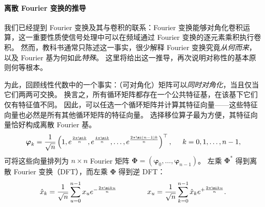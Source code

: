 


\paragraph{离散 Fourier 变换的推导}
我们已经提到 Fourier 变换及其与卷积的联系：Fourier 变换能够对角化卷积运算，这一重要性质使信号处理中可以在频域通过 Fourier 变换的逐元素乘积执行卷积。
%
然而，教科书通常只陈述这一事实，很少解释 Fourier 变换究竟{\em 从何而来}，以及 Fourier 基为何如此{\em 特殊}。
%
这里将给出这一推导，再次说明对称性的基本原则何等根本。


为此，回顾线性代数中的一个事实：（可对角化）矩阵可以{\em 同时对角化}，当且仅当它们两两可交换。
%
换言之，所有循环矩阵都存在一个公共特征基，在该基下它们仅有特征值不同。
%
因此，可以任选一个循环矩阵并计算其特征向量——这些特征向量也必然是所有其他循环矩阵的特征向量。
选择移位算子最为方便，其特征向量恰好构成离散 Fourier 基。
$$
\boldsymbol{\varphi}_k = \frac{1}{\sqrt{n}}\left (1, e^{ \frac{2\pi \mi k}{n}}, e^{ \frac{4\pi \mi k}{n} }, \hdots , e^{ \frac{2\pi \mi  (n-1)k}{n} }
\right)^\top, \hspace{5mm} k = 0, 1, \hdots, n-1,  
$$
%
可将这些向量排列为 $n\times n$ Fourier 矩阵 $\boldsymbol{\Phi} = (\boldsymbol{\varphi}_0, \hdots, \boldsymbol{\varphi}_{n-1})$。
% 
%
左乘 $\boldsymbol{\Phi}^*$
得到离散 Fourier 变换（DFT），而左乘 $\boldsymbol{\Phi}$ 得到逆 DFT：
$$
\hat{x}_k = \frac{1}{\sqrt{n}}\sum_{u = 0}^{n-1}x_u e^{-\frac{2\pi \mi k u}{n} } \hspace{15mm}
%
{x}_u = \frac{1}{\sqrt{n}} \sum_{k = 0}^{n-1}\hat{x}_k e^{+\frac{2\pi \mi k u}{n} }.
$$

